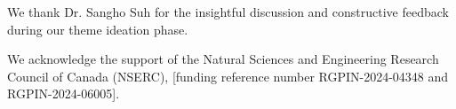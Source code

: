 We thank Dr. Sangho Suh for the insightful discussion and constructive feedback during our theme ideation phase. 

We acknowledge the support of the Natural Sciences and Engineering Research Council of Canada (NSERC), [funding reference number RGPIN-2024-04348 and RGPIN-2024-06005].